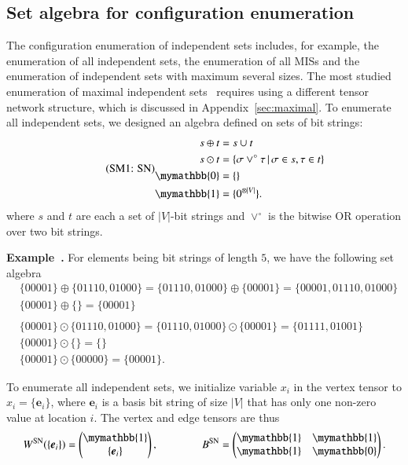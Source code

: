 \documentclass[onefignum, onetabnum]{siamart190516}
\newcommand{\eqname}[1]{\stepcounter{equation}\tag{\theequation : #1}}
\newcommand{\<}{\langle}
\renewcommand{\>}{\rangle}
\newcommand{\App}[1]{Appendix~\ref{#1}}
\newcounter{example}
\newenvironment{example}[1][]{\refstepcounter{example}\par\medskip
   \noindent \textbf{Example~\theexample. #1} \rmfamily}{\medskip}
\begin{document}
\subsection{Set algebra for configuration enumeration}
The configuration enumeration of independent sets includes,
for example, the enumeration of all independent sets, the enumeration of all MISs and the enumeration of independent sets with maximum several sizes.
The most studied enumeration of maximal independent sets~\cite{Bron1973, Eppstein2010, Johnson1988} requires using a different tensor network structure, which is discussed in \App{sec:maximal}.
To enumerate all independent sets, we designed an algebra defined on sets of bit strings:
\begin{equation}
\eqname{SN}
\begin{split}
    s \oplus t &= s \cup t\\
    s \odot t &= \{\sigma \lor^\circ \tau \, | \, \sigma \in s, \tau \in t\}\\
    \mymathbb{0} &= \{\}\\
    \mymathbb{1} &= \{0^{\otimes |V|}\}.
\end{split}\label{eq:set}
\end{equation}
where $s$ and $t$ are each a set of $|V|$-bit strings and $\lor^\circ$ is the bitwise OR operation over two bit strings.
\begin{example}\label{eg:setalgebra}
    For elements being bit strings of length $5$, we have the following set algebra
\begin{equation*}
\begin{split}
    &\{00001\} \oplus \{01110, 01000\} = \{01110, 01000\} \oplus \{00001\} = \{00001,01110, 01000\}\\
    &\{00001\} \oplus \{\} = \{00001\}\\
&\\
    &\{00001\} \odot \{01110, 01000\} = \{01110, 01000\} \odot \{00001\} = \{01111, 01001\}\\
    &\{00001\} \odot \{\} = \{\}\\
    &\{00001\} \odot \{00000\} = \{00001\}.
\end{split}
\end{equation*}
\end{example}

To enumerate all independent sets, 
we initialize variable $x_{i}$ in the vertex tensor to $x_i = \{\boldsymbol{e}_{i}\}$, where $\boldsymbol{e}_i$ is a basis bit string of size $|V|$ that has only one non-zero value at location $i$.
The vertex and edge tensors are thus
\begin{equation}
    W^{\rm SN}(\{\boldsymbol{e}_{i}\}) = \left(\begin{matrix}
        \mymathbb{1} \\
        \{\boldsymbol{e}_{i}\}
    \end{matrix}\right),   
    \qquad \qquad
        B^{\rm SN} = \left(\begin{matrix}
        \mymathbb{1}  & \mymathbb{1} \\
        \mymathbb{1} & \mymathbb{0}
    \end{matrix}\right).
\end{equation}
\end{document}
